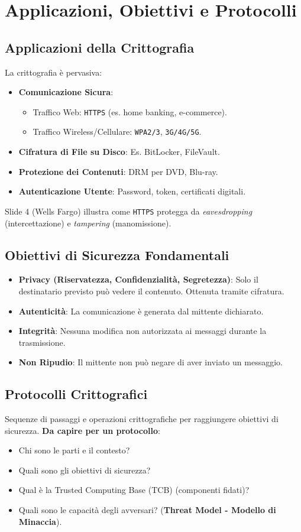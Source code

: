 \documentclass{article}
\begin{document}
\section{Applicazioni, Obiettivi e Protocolli}

\subsection{Applicazioni della Crittografia}
La crittografia è pervasiva:
\begin{itemize}
    \item \textbf{Comunicazione Sicura}:
    \begin{itemize}
        \item Traffico Web: \texttt{HTTPS} (es. home banking, e-commerce).
        \item Traffico Wireless/Cellulare: \texttt{WPA2/3}, \texttt{3G/4G/5G}.
    \end{itemize}
    \item \textbf{Cifratura di File su Disco}: Es. BitLocker, FileVault.
    \item \textbf{Protezione dei Contenuti}: DRM per DVD, Blu-ray.
    \item \textbf{Autenticazione Utente}: Password, token, certificati digitali.
\end{itemize}
Slide 4 (Wells Fargo) illustra come \texttt{HTTPS} protegga da \textit{eavesdropping} (intercettazione) e \textit{tampering} (manomissione).

\subsection{Obiettivi di Sicurezza Fondamentali}
\begin{itemize}
    \item \textbf{Privacy (Riservatezza, Confidenzialità, Segretezza)}: Solo il destinatario previsto può vedere il contenuto. Ottenuta tramite cifratura.
    \item \textbf{Autenticità}: La comunicazione è generata dal mittente dichiarato.
    \item \textbf{Integrità}: Nessuna modifica non autorizzata ai messaggi durante la trasmissione.
    \item \textbf{Non Ripudio}: Il mittente non può negare di aver inviato un messaggio.
\end{itemize}

\subsection{Protocolli Crittografici}
Sequenze di passaggi e operazioni crittografiche per raggiungere obiettivi di sicurezza.
\textbf{Da capire per un protocollo}:
\begin{itemize}
    \item Chi sono le parti e il contesto?
    \item Quali sono gli obiettivi di sicurezza?
    \item Qual è la Trusted Computing Base (TCB) (componenti fidati)?
    \item Quali sono le capacità degli avversari? (\textbf{Threat Model - Modello di Minaccia}).
\end{itemize}
\end{document}
